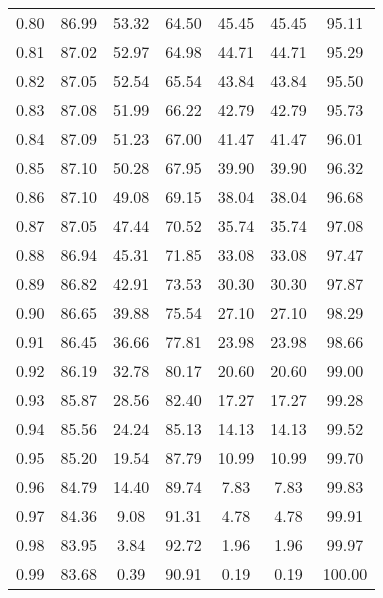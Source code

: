 \begin{tabular}{|c|c|c|c|c|c|c|}
      0.80 &     86.99 &     53.32 &      64.50 &   45.45 &      45.45 &         95.11 \\
      0.81 &     87.02 &     52.97 &      64.98 &   44.71 &      44.71 &         95.29 \\
      0.82 &     87.05 &     52.54 &      65.54 &   43.84 &      43.84 &         95.50 \\
      0.83 &     87.08 &     51.99 &      66.22 &   42.79 &      42.79 &         95.73 \\
      0.84 &     87.09 &     51.23 &      67.00 &   41.47 &      41.47 &         96.01 \\
      0.85 &     87.10 &     50.28 &      67.95 &   39.90 &      39.90 &         96.32 \\
      0.86 &     87.10 &     49.08 &      69.15 &   38.04 &      38.04 &         96.68 \\
      0.87 &     87.05 &     47.44 &      70.52 &   35.74 &      35.74 &         97.08 \\
      0.88 &     86.94 &     45.31 &      71.85 &   33.08 &      33.08 &         97.47 \\
      0.89 &     86.82 &     42.91 &      73.53 &   30.30 &      30.30 &         97.87 \\
      0.90 &     86.65 &     39.88 &      75.54 &   27.10 &      27.10 &         98.29 \\
      0.91 &     86.45 &     36.66 &      77.81 &   23.98 &      23.98 &         98.66 \\
      0.92 &     86.19 &     32.78 &      80.17 &   20.60 &      20.60 &         99.00 \\
      0.93 &     85.87 &     28.56 &      82.40 &   17.27 &      17.27 &         99.28 \\
      0.94 &     85.56 &     24.24 &      85.13 &   14.13 &      14.13 &         99.52 \\
      0.95 &     85.20 &     19.54 &      87.79 &   10.99 &      10.99 &         99.70 \\
      0.96 &     84.79 &     14.40 &      89.74 &    7.83 &       7.83 &         99.83 \\
      0.97 &     84.36 &      9.08 &      91.31 &    4.78 &       4.78 &         99.91 \\
      0.98 &     83.95 &      3.84 &      92.72 &    1.96 &       1.96 &         99.97 \\
      0.99 &     83.68 &      0.39 &      90.91 &    0.19 &       0.19 &        100.00 \\
\bottomrule
\end{tabular}
